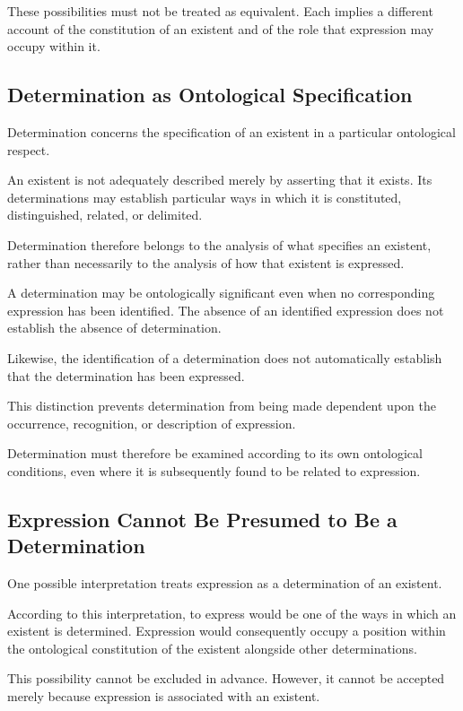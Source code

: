 These possibilities must not be treated as equivalent.
Each implies a different account of the constitution
of an existent and of the role that expression may
occupy within it.

\subsection{Determination as Ontological Specification}

Determination concerns the specification of an existent
in a particular ontological respect.

An existent is not adequately described merely by
asserting that it exists. Its determinations may
establish particular ways in which it is constituted,
distinguished, related, or delimited.

Determination therefore belongs to the analysis
of what specifies an existent, rather than necessarily
to the analysis of how that existent is expressed.

A determination may be ontologically significant
even when no corresponding expression has been
identified. The absence of an identified expression
does not establish the absence of determination.

Likewise, the identification of a determination
does not automatically establish that the determination
has been expressed.

This distinction prevents determination from being
made dependent upon the occurrence, recognition,
or description of expression.

Determination must therefore be examined according
to its own ontological conditions, even where it
is subsequently found to be related to expression.

\subsection{Expression Cannot Be Presumed to Be a Determination}

One possible interpretation treats expression as
a determination of an existent.

According to this interpretation, to express would
be one of the ways in which an existent is determined.
Expression would consequently occupy a position
within the ontological constitution of the existent
alongside other determinations.

This possibility cannot be excluded in advance.
However, it cannot be accepted merely because
expression is associated with an existent.

